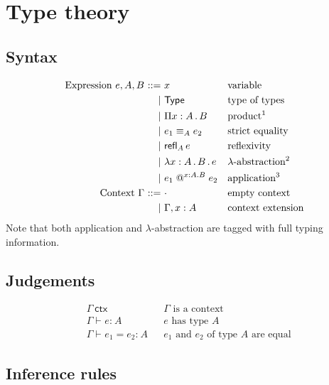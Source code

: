 \documentclass{article}
\makeatletter
\newcommand{\Type}{\mathsf{Type}}
\newcommand{\ctx}{\Gamma}
\newcommand{\emptyctx}{\cdot}
\newcommand{\isctx}[1]{#1\ \mathsf{ctx}}
\newcommand{\of}[1][]{:_{#1}}
\newcommand{\prd}[1]{\Pi #1 \,.\,}
\newcommand{\Eq}[3][]{#2 \equiv_{#1} #3}
\newcommand{\refl}[2][]{\mathsf{refl}_{#1}\,#2}
\newcommand{\lam}[1]{\lambda #1 \,.\,}
\newcommand{\abs}[1]{#1 .}
\newcommand{\app}[3][]{#2 \mathrel{@}^{#1} #3}
\newcommand{\ent}[1][]{\vdash_{#1}}
\newcommand{\bnfis}{\mathbin{{:}{:}{=}}}
\newcommand{\bnfor}{\mathbin{\mid}}
\makeatother
\begin{document}
\section{Type theory}

\subsection{Syntax}

\begin{align*}
  \text{Expression}\ e, A, B \
    \bnfis \ & x                              & & \text{variable}\\
    \bnfor \ & \Type                          & & \text{type of types}\\
    \bnfor \ & \prd{x : A} B                  & & \text{product\footnotemark} \\
    \bnfor \ & \Eq[A]{e_1}{e_2}               & & \text{strict equality} \\
    \bnfor \ & \refl[A]{e}                    & & \text{reflexivity} \\
    \bnfor \ & \lam{x : A \,.\, B} e          & & \text{$\lambda$-abstraction\footnotemark} \\
    \bnfor \ & \app[\abs{x : A} B]{e_1}{e_2}  & & \text{application\footnotemark}
  \\
  \text{Context}\ \ctx\
     \bnfis \ & \emptyctx                     & & \text{empty context} \\
     \bnfor \ & \ctx, x : A                   & & \text{context extension}
\end{align*}
%
%
%
\footnotetext{$x$ is bound in $B$}%
%
Note that both application and $\lambda$-abstraction are tagged with full typing information.


\subsection{Judgements}

\begin{align*}
  & \isctx{\ctx}                & & \text{$\ctx$ is a context}  \\
  & \ctx \ent e \of A         & & \text{$e$ has type $A$}  \\
  & \ctx \ent e_1 = e_2 \of A & & \text{$e_1$ and $e_2$ of type $A$ are equal}
\end{align*}

\subsection{Inference rules}
\end{document}
